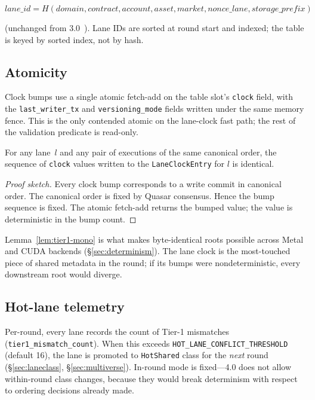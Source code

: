\[
\mathit{lane\_id} = H(\mathit{domain}, \mathit{contract},
\mathit{account}, \mathit{asset}, \mathit{market}, \mathit{nonce\_lane},
\mathit{storage\_prefix})
\]

(unchanged from 3.0~\cite{lp010-quasarstm-3}). Lane IDs are sorted at
round start and indexed; the table is keyed by sorted index, not by
hash.

\subsection{Atomicity}

Clock bumps use a single atomic fetch-add on the table slot's
\texttt{clock} field, with the \texttt{last\_writer\_tx} and
\texttt{versioning\_mode} fields written under the same memory fence.
This is the only contended atomic on the lane-clock fast path; the rest
of the validation predicate is read-only.

\begin{lemma}
\label{lem:tier1-mono}
For any lane~$l$ and any pair of executions of the same canonical
order, the sequence of \texttt{clock} values written to the
\texttt{LaneClockEntry} for $l$ is identical.
\end{lemma}
\begin{proof}[Proof sketch]
Every clock bump corresponds to a write commit in canonical order. The
canonical order is fixed by Quasar consensus. Hence the bump sequence
is fixed. The atomic fetch-add returns the bumped value; the value is
deterministic in the bump count.
\end{proof}

Lemma~\ref{lem:tier1-mono} is what makes byte-identical roots possible
across Metal and CUDA backends (\S\ref{sec:determinism}). The lane
clock is the most-touched piece of shared metadata in the round; if
its bumps were nondeterministic, every downstream root would diverge.

\subsection{Hot-lane telemetry}

Per-round, every lane records the count of Tier-1 mismatches
(\texttt{tier1\_mismatch\_count}). When this exceeds
\texttt{HOT\_LANE\_CONFLICT\_THRESHOLD} (default 16), the lane is
promoted to \texttt{HotShared} class for the \emph{next} round
(\S\ref{sec:laneclass}, \S\ref{sec:multiverse}). In-round mode is
fixed---4.0 does not allow within-round class changes, because they
would break determinism with respect to ordering decisions already
made.

